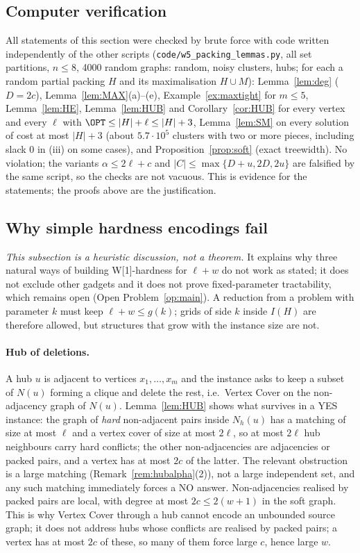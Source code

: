 \subsection{Computer verification}
All statements of this section were checked by brute force with code written independently of the other scripts (\texttt{code/w5\_packing\_lemmas.py}, all set partitions, $n\le8$, 4000 random graphs: random, noisy clusters, hubs; for each a random partial packing $H$ and its maximalisation $H\cup M$): Lemma~\ref{lem:deg} ($D=2c$), Lemma~\ref{lem:MAX}(a)--(e), Example~\ref{ex:maxtight} for $m\le5$, Lemma~\ref{lem:HE}, Lemma~\ref{lem:HUB} and Corollary~\ref{cor:HUB} for every vertex and every $\ell$ with $\OPT\le|H|+\ell\le|H|+3$, Lemma~\ref{lem:SM} on every solution of cost at most $|H|+3$ (about $5.7\cdot10^5$ clusters with two or more pieces, including slack $0$ in (iii) on some cases), and Proposition~\ref{prop:soft} (exact treewidth). No violation; the variants $\alpha\le2\ell+c$ and $|C|\le\max\{D+u,2D,2u\}$ are falsified by the same script, so the checks are not vacuous. This is evidence for the statements; the proofs above are the justification.

\subsection{Why simple hardness encodings fail}\label{sec:why}
\emph{This subsection is a heuristic discussion, not a theorem.} It explains why three natural ways of building W[1]-hardness for $\ell+w$ do not work as stated; it does not exclude other gadgets and it does not prove fixed-parameter tractability, which remains open (Open Problem~\ref{op:main}). A reduction from a problem with parameter $k$ must keep $\ell+w\le g(k)$; grids of side $k$ inside $I(H)$ are therefore allowed, but structures that grow with the instance size are not.

\paragraph{Hub of deletions.} A hub $u$ is adjacent to vertices $x_1,\dots,x_m$ and the instance asks to keep a subset of $N(u)$ forming a clique and delete the rest, i.e.\ Vertex Cover on the non-adjacency graph of $N(u)$. Lemma~\ref{lem:HUB} shows what survives in a YES instance: the graph of \emph{hard} non-adjacent pairs inside $N_h(u)$ has a matching of size at most $\ell$ and a vertex cover of size at most $2\ell$, so at most $2\ell$ hub neighbours carry hard conflicts; the other non-adjacencies are adjacencies or packed pairs, and a vertex has at most $2c$ of the latter. The relevant obstruction is a large matching (Remark~\ref{rem:hubalpha}(2)), not a large independent set, and any such matching immediately forces a NO answer. Non-adjacencies realised by packed pairs are local, with degree at most $2c\le2(w+1)$ in the soft graph. This is why Vertex Cover through a hub cannot encode an unbounded source graph; it does not address hubs whose conflicts are realised by packed pairs; a vertex has at most $2c$ of these, so many of them force large $c$, hence large $w$.

